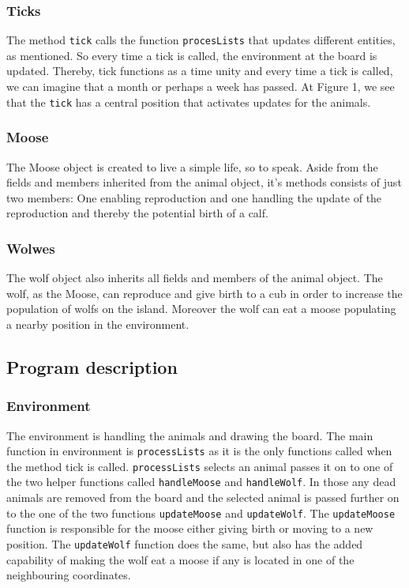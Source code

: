 \documentclass[a4paper]{report}
\begin{document}
\subsubsection*{Ticks}
The method \texttt{tick} calls the function \texttt{procesLists} that updates different entities, as mentioned. So every time a tick is called, the environment at the board is updated. Thereby, tick functions as a time unity and every time a tick is called, we can imagine that a month or perhaps a week has passed. At Figure 1, we see that the \texttt{tick} has a central position that activates updates for the animals.

\subsubsection*{Moose}
The Moose object is created to live a simple life, so to speak. Aside from the fields and members inherited from the animal object, it's methods consists of just two members: One enabling reproduction and one handling the update of the reproduction and thereby the potential birth of a calf.

\subsubsection*{Wolwes}
The wolf object also inherits all fields and members of the animal object. The wolf, as the Moose, can reproduce and give birth to a cub in order to increase the population of wolfs on the island. Moreover the wolf can eat a moose populating a nearby position in the environment. 







\subsection*{Program description}

\subsubsection*{Environment}
The environment is handling the animals and drawing the board. The main function in environment is \texttt{processLists}  as it is the only functions called when the method tick is called.
\texttt{processLists} selects an animal passes it on to one of the two helper functions called \texttt{handleMoose}  and \texttt{handleWolf}. In those any dead animals are removed from the board and the selected animal is passed further on to the one of the two functions \texttt{updateMoose} and \texttt{updateWolf}. The \texttt{updateMoose} function is responsible for the moose either giving birth or moving to a new position.
The \texttt{updateWolf} function does the same, but also has the added capability of making the wolf eat a moose if any is located in one of the neighbouring coordinates.
\end{document}
